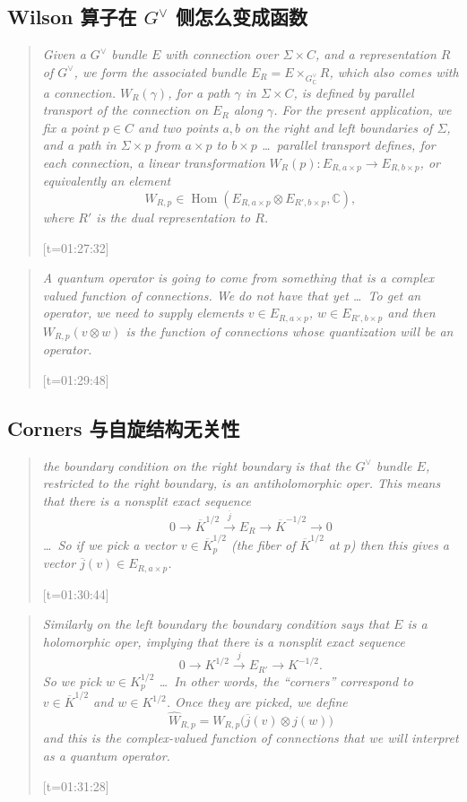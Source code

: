 \documentclass[11pt,a4paper]{ctexart}
\newcommand{\slq}[2]{%
  \begin{quote}\small\itshape #2\par
  \raggedleft\normalfont\footnotesize\textcolor{gray}{[t=#1]}\end{quote}}
\newcommand{\Hom}{\operatorname{Hom}}
\begin{document}
\subsection{Wilson 算子在 $G^\vee$ 侧怎么变成函数}

\slq{01:27:32}{Given a $G^{\vee}$ bundle $E$ with connection over $\Sigma\times C$, and a representation
$R$ of $G^{\vee}$, we form the associated bundle $E_R=E\times_{G^{\vee}_{\mathbb{C}}}R$, which also comes
with a connection. $W_R(\gamma)$, for a path $\gamma$ in $\Sigma\times C$, is defined by parallel transport
of the connection on $E_R$ along $\gamma$. For the present application, we fix a point $p\in C$ and two
points $a,b$ on the right and left boundaries of $\Sigma$, and a path in $\Sigma\times p$ from $a\times p$
to $b\times p$ \dots\ parallel transport defines, for each connection, a linear transformation
$W_R(p):E_{R,a\times p}\to E_{R,b\times p}$, or equivalently an element
\[
W_{R,p}\in\Hom(E_{R,a\times p}\otimes E_{R',b\times p},\mathbb{C}),
\]
where $R'$ is the dual representation to $R$.}

\slq{01:29:48}{A quantum operator is going to come from something that is a complex valued function of
connections. We do not have that yet \dots\ To get an operator, we need to supply elements
$v\in E_{R,a\times p}$, $w\in E_{R',b\times p}$ and then $W_{R,p}(v\otimes w)$ is the function of
connections whose quantization will be an operator.}


\subsection{Corners 与自旋结构无关性}

\slq{01:30:44}{the boundary condition on the right boundary is that the $G^{\vee}$ bundle $E$, restricted
to the right boundary, is an antiholomorphic oper. This means that there is a nonsplit exact sequence
\[
0\to\overline{K}^{1/2}\xrightarrow{\overline{j}}E_R\to\overline{K}^{-1/2}\to 0
\]
\dots\ So if we pick a vector $v\in\overline{K}_p^{1/2}$ (the fiber of $\overline{K}^{1/2}$ at $p$) then
this gives a vector $\overline{j}(v)\in E_{R,a\times p}$.}

\slq{01:31:28}{Similarly on the left boundary the boundary condition says that $E$ is a holomorphic oper,
implying that there is a nonsplit exact sequence
\[
0\to K^{1/2}\xrightarrow{j}E_{R'}\to K^{-1/2}.
\]
So we pick $w\in K_p^{1/2}$ \dots\ In other words, the ``corners'' correspond to
$v\in\overline{K}^{1/2}$ and $w\in K^{1/2}$. Once they are picked, we define
\[
\widehat{W}_{R,p}=W_{R,p}\bigl(\overline{j}(v)\otimes j(w)\bigr)
\]
and this is the complex-valued function of connections that we will interpret as a quantum operator.}
\end{document}
